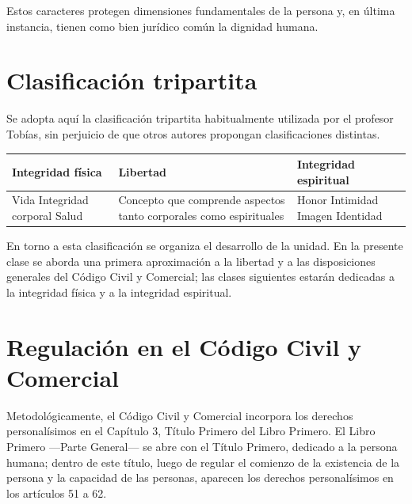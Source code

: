 \documentclass[12pt,oneside]{book}
\begin{document}
\begin{important}
Estos caracteres protegen dimensiones fundamentales de la persona y, en última instancia, tienen como bien jurídico común la dignidad humana.
\end{important}

\section{Clasificación tripartita}

Se adopta aquí la clasificación tripartita habitualmente utilizada por el profesor Tobías, sin perjuicio de que otros autores propongan clasificaciones distintas.

\begin{table}[H]
\centering
\begin{tabular}{p{} p{} p{}}
\toprule
\textbf{Integridad física} & \textbf{Libertad} & \textbf{Integridad espiritual} \\
\midrule
Vida \newline Integridad corporal \newline Salud &
Concepto que comprende aspectos tanto corporales como espirituales &
Honor \newline Intimidad \newline Imagen \newline Identidad \\
\bottomrule
\end{tabular}
\end{table}

En torno a esta clasificación se organiza el desarrollo de la unidad. En la presente clase se aborda una primera aproximación a la libertad y a las disposiciones generales del Código Civil y Comercial; las clases siguientes estarán dedicadas a la integridad física y a la integridad espiritual.

\section{Regulación en el Código Civil y Comercial}

Metodológicamente, el Código Civil y Comercial incorpora los derechos personalísimos en el Capítulo 3, Título Primero del Libro Primero. El Libro Primero —Parte General— se abre con el Título Primero, dedicado a la persona humana; dentro de este título, luego de regular el comienzo de la existencia de la persona y la capacidad de las personas, aparecen los derechos personalísimos en los artículos 51 a 62.
\end{document}
